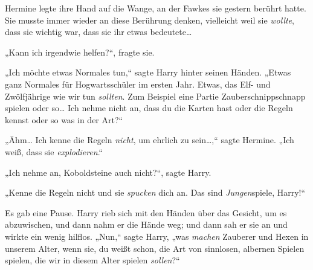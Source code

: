 Hermine legte ihre Hand auf die Wange, an der Fawkes sie gestern berührt hatte. Sie musste immer wieder an diese Berührung denken, vielleicht weil sie \emph{wollte}, dass sie wichtig war, dass sie ihr etwas bedeutete…

„Kann ich irgendwie helfen?“, fragte sie.

„Ich möchte etwas Normales tun,“ sagte Harry hinter seinen Händen. „Etwas ganz Normales für Hogwartsschüler im ersten Jahr. Etwas, das Elf- und Zwölfjährige wie wir tun \emph{sollten}. Zum Beispiel eine Partie Zauberschnippschnapp spielen oder so… Ich nehme nicht an, dass du die Karten hast oder die Regeln kennst oder so was in der Art?“

„Ähm… Ich kenne die Regeln \emph{nicht}, um ehrlich zu sein…,“ sagte Hermine. „Ich weiß, dass sie \emph{explodieren}.“

„Ich nehme an, Koboldsteine auch nicht?“, sagte Harry.

„Kenne die Regeln nicht und sie \emph{spucken} dich an. Das sind \emph{Jungen}{}spiele, Harry!“

Es gab eine Pause. Harry rieb sich mit den Händen über das Gesicht, um es abzuwischen, und dann nahm er die Hände weg; und dann sah er sie an und wirkte ein wenig hilflos. „Nun,“ sagte Harry, „was \emph{machen} Zauberer und Hexen in unserem Alter, wenn sie, du weißt schon, die Art von sinnlosen, albernen Spielen spielen, die wir in diesem Alter spielen \emph{sollen}?“

